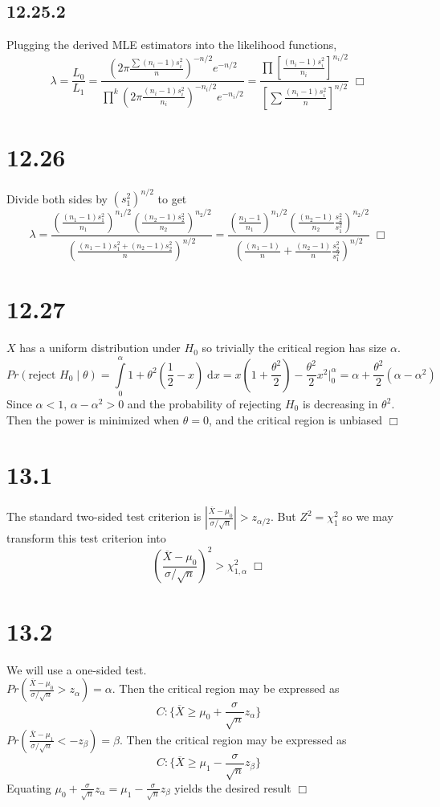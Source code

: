 \documentclass{article}
\begin{document}
\subsection*{12.25.2}
Plugging the derived MLE estimators into the likelihood functions,
$$\lambda = \frac{L_0}{L_1} = \frac{(2\pi\frac{\sum(n_i-1)s_i^2}{n})^{-n/2} e^{-n/2}}{\prod\limits^k (2\pi\frac{(n_i-1)s_i^2}{n_i})^{-n_i/2} e^{-n_i/2}} = \frac{\prod \left[\frac{(n_i-1)s_i^2}{n_i}\right]^{n_i/2}}{\left[\sum \frac{(n_i-1)s_i^2}{n}\right]^{n/2}} \; \Box$$

\section*{12.26}
Divide both sides by $(s_1^2)^{n/2}$ to get
$$\lambda = \frac{\left(\frac{(n_1-1)s_1^2}{n_1}\right)^{n_1/2} \left(\frac{(n_2-1)s_2^2}{n_2}\right)^{n_2/2}}{\left(\frac{(n_1-1)s_1^2 + (n_2-1)s_2^2}{n}\right)^{n/2}} = \frac{\left(\frac{n_1-1}{n_1}\right)^{n_1/2}\left(\frac{(n_2-1)}{n_2}\frac{s_2^2}{s_1^2}\right)^{n_2/2}}{\left(\frac{(n_1-1)}{n}+\frac{(n_2-1)}{n}\frac{s_2^2}{s_1^2}\right)^{n/2}} \; \Box$$

\section*{12.27}
$X$ has a uniform distribution under $H_0$ so trivially the critical region has size $\alpha$.
$$Pr(\textrm{reject } H_0 \;|\; \theta) = \int\limits_0^\alpha 1 + \theta^2(\frac{1}{2}-x)\;\mathrm{d}x = x\left(1+\frac{\theta^2}{2}\right)-\frac{\theta^2}{2}x^2 \Big\vert_0^\alpha = \alpha + \frac{\theta^2}{2}(\alpha-\alpha^2)$$
Since $\alpha < 1$, $\alpha - \alpha^2 > 0$ and the probability of rejecting $H_0$ is decreasing in $\theta^2$. Then the power is minimized when $\theta = 0$, and the critical region is unbiased $\Box$

\section*{13.1}
The standard two-sided test criterion is $\left\vert\frac{\overline{X}-\mu_0}{\sigma/\sqrt{n}}\right\vert > z_{\alpha/2}$. But $Z^2 = \chi^2_1$ so we may transform this test criterion into
$$\left(\frac{\overline{X}-\mu_0}{\sigma/\sqrt{n}}\right)^2 > \chi^2_{1,\alpha} \; \Box$$

\section*{13.2}
We will use a one-sided test.\\
$Pr(\frac{\overline{X}-\mu_0}{\sigma/\sqrt{n}} > z_\alpha) = \alpha$. Then the critical region may be expressed as
$$C : \{\overline{X} \geqslant \mu_0 + \frac{\sigma}{\sqrt{n}}z_\alpha\}$$
$Pr(\frac{\overline{X}-\mu_1}{\sigma/\sqrt{n}} < -z_\beta) = \beta$. Then the critical region may be expressed as
$$C : \{\overline{X} \geqslant \mu_1 - \frac{\sigma}{\sqrt{n}}z_\beta\}$$
Equating $\mu_0 + \frac{\sigma}{\sqrt{n}}z_\alpha = \mu_1 - \frac{\sigma}{\sqrt{n}}z_\beta$ yields the desired result $\Box$
\end{document}
